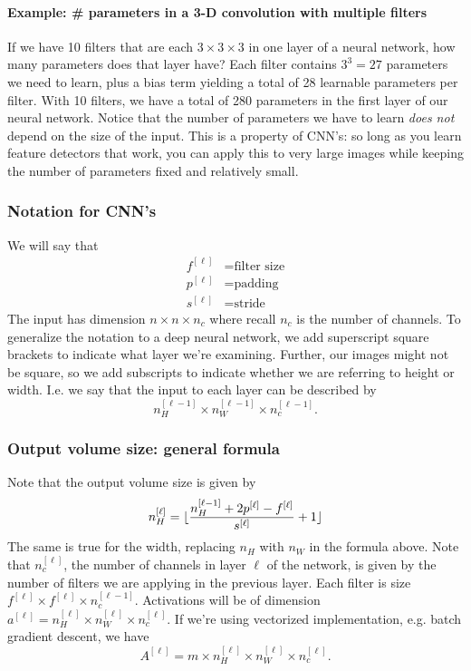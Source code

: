 \documentclass[12pt]{article}
\begin{document}
\paragraph{Example: \# parameters in a 3-D convolution with multiple filters} If we have 10 filters that are each $3 \times 3 \times 3$ in one layer of a neural network, how many
parameters does that layer have? Each filter contains $3^3 = 27$ parameters we need to learn, plus a bias term yielding a total of 
28 learnable parameters per filter. With 10 filters, we have a total of 280 parameters in the first layer of our neural network.
Notice that the number of parameters we have to learn \emph{does not} depend on the size of the input. This is a property of CNN's: so long as you learn feature detectors that work, you can apply this to very large images while keeping the number of parameters fixed and relatively small.

\subsubsection{Notation for CNN's}
We will say that
\begin{align*}   f^{[\ell]} &= \textrm{filter size} \\
  p^{[\ell]} &= \textrm{padding} \\
  s^{[\ell]} &= \textrm{stride} \end{align*}
The input has dimension $n \times n \times n_c$ where recall $n_c$ is the number of channels. To generalize the notation to a 
deep neural network, we add superscript square brackets to indicate what layer we're examining. Further, our images might not be square, so we add subscripts to indicate whether we are referring to height or width. I.e. we say that the input
to each layer can be described by
\[
n_H^{[\ell-1]} \times n_W^{[\ell-1]} \times n_c^{[\ell-1]}.
\]

\subsubsection{Output volume size: general formula}
Note that the output volume size is given by 
\[
n_H^{[\ell]} = \lfloor\frac{n_H^{[\ell-1]} + 2p^{[\ell]} - f^{[\ell]}}{s^{[\ell]}} + 1\rfloor
\]
The same is true for the width, replacing $n_H$ with $n_W$ in the formula above. Note that $n_c^{[\ell]}$, the number of channels in layer $\ell$ of the network, is given by the number of filters we are applying in the previous layer.
Each filter is size $f^{[\ell]} \times f^{[\ell]} \times n_c^{[\ell-1]}$. Activations will be of dimension $a^{[\ell]} = n_H^{[\ell]} \times n_W^{[\ell]} \times n_c^{[\ell]}$. If we're using vectorized implementation, e.g. batch gradient descent, we have
\[
A^{[\ell]} = m \times n_H^{[\ell]} \times n_W^{[\ell]} \times n_c^{[\ell]}.
\]
\end{document}
